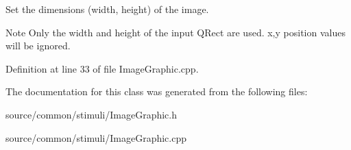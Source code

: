 Set the dimensions (width, height) of the image. 

\begin{DoxyNote}{Note}
Only the width and height of the input Q\-Rect are used. x,y position values will be ignored. 
\end{DoxyNote}


Definition at line 33 of file Image\-Graphic.\-cpp.



The documentation for this class was generated from the following files\-:\begin{DoxyCompactItemize}
\item 
source/common/stimuli/Image\-Graphic.\-h\item 
source/common/stimuli/Image\-Graphic.\-cpp\end{DoxyCompactItemize}

